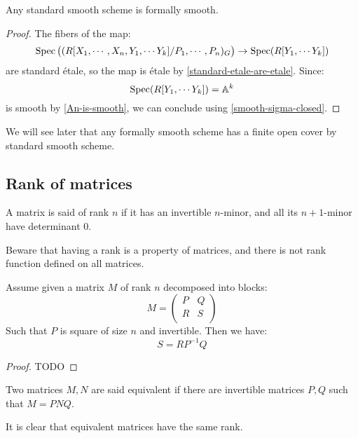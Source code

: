 \begin{lemma}\label{standard-smooth-is-smooth}
Any standard smooth scheme is formally smooth.
\end{lemma}

\begin{proof}
The fibers of the map:
\[\operatorname{Spec}\big((R[X_1,\cdots,X_n,Y_1,\cdots Y_{k}] / P_1,\cdots,P_n)_G\big) \to \operatorname{Spec}(R[Y_1,\cdots Y_{k}])\]
are standard étale, so the map is étale by \cref{standard-etale-are-etale}. Since:
\[\operatorname{Spec}(R[Y_1,\cdots Y_{k}]) = \mathbb{A}^k\]
is smooth by \cref{An-is-smooth}, we can conclude using \cref{smooth-sigma-closed}.
\end{proof}

\begin{remark}
We will see later that any formally smooth scheme has a finite open cover by standard smooth scheme. 
\end{remark}


\subsection{Rank of matrices}

\begin{definition}
A matrix is said of rank $n$ if it has an invertible $n$-minor, and all its $n+1$-minor have determinant $0$.
\end{definition}

Beware that having a rank is a property of matrices, and there is not rank function defined on all matrices.

\begin{lemma}\label{rank-bloc-matrix}
Assume given a matrix $M$ of rank $n$ decomposed into blocks:
\[M = \begin{pmatrix}
P & Q  \\
R & S \\
\end{pmatrix}\]
Such that $P$ is square of size $n$ and invertible. Then we have:
\[S = RP^{-1}Q\]
\end{lemma}

\begin{proof}
TODO
\end{proof}

\begin{definition}
Two matrices $M,N$ are said equivalent if there are invertible matrices $P,Q$ such that $M = PNQ$.
\end{definition}

It is clear that equivalent matrices have the same rank.


